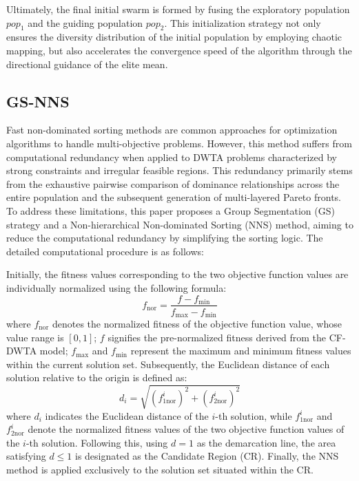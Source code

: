 \documentclass[lettersize,journal]{IEEEtran}
\begin{document}
Ultimately, the final initial swarm is formed by fusing the exploratory population $pop_1$ and the guiding population $pop_2$. This initialization strategy not only ensures the diversity distribution of the initial population by employing chaotic mapping, but also accelerates the convergence speed of the algorithm through the directional guidance of the elite mean.


\subsection{GS-NNS}
Fast non-dominated sorting methods are common approaches for optimization algorithms to handle multi-objective problems.
However, this method suffers from computational redundancy when applied to DWTA problems characterized by strong constraints and irregular feasible regions. 
This redundancy primarily stems from the exhaustive pairwise comparison of dominance relationships across the entire population and the subsequent generation of multi-layered Pareto fronts.
To address these limitations, this paper proposes a Group Segmentation (GS) strategy and a Non-hierarchical Non-dominated Sorting (NNS) method, aiming to reduce the computational redundancy by simplifying the sorting logic. The detailed computational procedure is as follows:

Initially, the fitness values corresponding to the two objective function values are individually normalized using the following formula:
\begin{equation}
    {f_{\text{nor}}}=\frac{f - {f_{\text{min}}}}{{f_{\text{max}}}-{f_{\text{min}}}}
\end{equation}
where $f_{\text{nor}}$ denotes the normalized fitness of the objective function value, whose value range is $[0, 1]$; $f$ signifies the pre-normalized fitness derived from the CF-DWTA model; $f_{\text{max}}$ and $f_{\text{min}}$ represent the maximum and minimum fitness values within the current solution set. Subsequently, the Euclidean distance of each solution relative to the origin is defined as:
\begin{equation}
    d_i=\sqrt{(f_{1\text{nor}}^i)^2+(f_{2\text{nor}}^i)^2}
\end{equation}
where $d_i$ indicates the Euclidean distance of the $i$-th solution, while $f_{1\text{nor}}^i$ and $f_{2\text{nor}}^i$ denote the normalized fitness values of the two objective function values of the $i$-th solution. Following this, using $d=1$ as the demarcation line, the area satisfying $d \leq 1$ is designated as the Candidate Region (CR). Finally, the NNS method is applied exclusively to the solution set situated within the CR.
\end{document}
